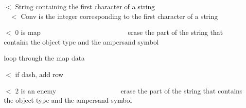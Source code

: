 $<$ String containing the first character of a string ~\newline
~\newline
~\newline
~\newline
~\newline
~\newline
~\newline
~\newline
~\newline
~\newline
~\newline
~\newline
~\newline
~\newline
~\newline
~\newline
~\newline
 $<$ Conv is the integer corresponding to the first character of a string

$<$ 0 is map ~\newline
~\newline
~\newline
~\newline
~\newline
~\newline
~\newline
~\newline
~\newline
~\newline
~\newline
~\newline
~\newline
~\newline
~\newline
 erase the part of the string that contains the object type and the ampersand symbol

loop through the map data

$<$ if dash, add row

$<$ 2 is an enemy ~\newline
~\newline
~\newline
~\newline
~\newline
~\newline
~\newline
~\newline
~\newline
~\newline
~\newline
 erase the part of the string that contains the object type and the ampersand symbol

